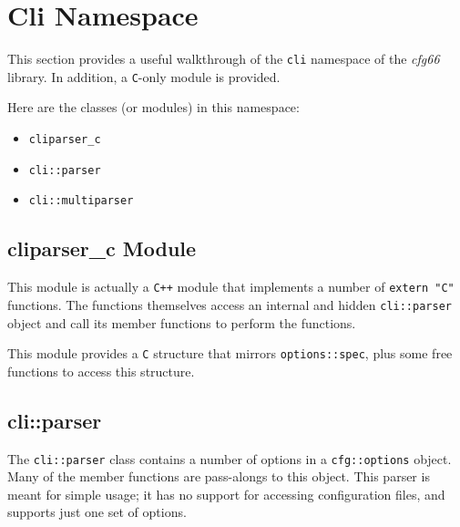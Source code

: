%
%
%

\section{Cli Namespace}
\label{sec:cli_namespace}

   This section provides a useful walkthrough of the \texttt{cli} namespace of
   the \textsl{cfg66} library.
   In addition, a \texttt{C}-only module is provided.

   Here are the classes (or modules) in this namespace:

   \begin{itemize}
      \item \texttt{cliparser\_c}
      \item \texttt{cli::parser}
      \item \texttt{cli::multiparser}
   \end{itemize}

\subsection{cliparser\_c Module}
\label{subsec:cli_namespace_c}

   This module is actually a \texttt{C++} module that implements a number of
   \texttt{extern "C"} functions.
   The functions themselves access an internal and hidden
   \texttt{cli::parser} object and call its member functions to
   perform the functions.

   This module provides a \texttt{C} structure that mirrors
   \texttt{options::spec}, plus some free functions to access this
   structure.

\subsection{cli::parser}
\label{subsec:cli_namespace_parser}

   The \texttt{cli::parser} class contains a number of options in a
   \texttt{cfg::options} object.
   Many of the member functions are pass-alongs to this object.
   This parser is meant for simple usage; it has no support for accessing
   configuration files, and supports just one set of options.

